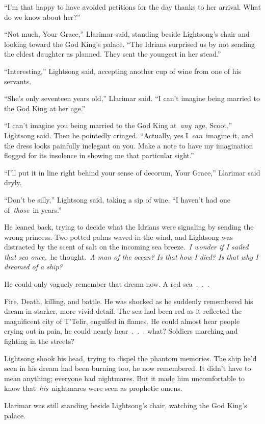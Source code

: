 “I’m that happy to have avoided petitions for the day thanks to her arrival. What do we know about her?”

“Not much, Your Grace,” Llarimar said, standing beside Lightsong’s chair and looking toward the God King’s palace. “The Idrians surprised us by not sending the eldest daughter as planned. They sent the youngest in her stead.”

“Interesting,” Lightsong said, accepting another cup of wine from one of his servants.

“She’s only seventeen years old,” Llarimar said. “I can’t imagine being married to the God King at her age.”

“I can’t imagine you being married to the God King at~\textit{any}~age, Scoot,” Lightsong said. Then he pointedly cringed. “Actually, yes I~\textit{can}~imagine it, and the dress looks painfully inelegant on you. Make a note to have my imagination flogged for its insolence in showing me that particular sight.”

“I’ll put it in line right behind your sense of decorum, Your Grace,” Llarimar said dryly.

“Don’t be silly,” Lightsong said, taking a sip of wine. “I haven’t had one of~\textit{those}~in years.”

He leaned back, trying to decide what the Idrians were signaling by sending the wrong princess. Two potted palms waved in the wind, and Lightsong was distracted by the scent of salt on the incoming sea breeze.~\textit{I wonder if I sailed that sea once,}~he thought.~\textit{A man of the ocean? Is that how I died? Is that why I dreamed of a ship?}

He could only vaguely remember that dream now. A red sea~.~.~.

Fire. Death, killing, and battle. He was shocked as he suddenly remembered his dream in starker, more vivid detail. The sea had been red as it reflected the magnificent city of T’Telir, engulfed in flames. He could almost hear people crying out in pain, he could nearly hear~.~.~. what? Soldiers marching and fighting in the streets?

Lightsong shook his head, trying to dispel the phantom memories. The ship he’d seen in his dream had been burning too, he now remembered. It didn’t have to mean anything; everyone had nightmares. But it made him uncomfortable to know that~\textit{his}~nightmares were seen as prophetic omens.

Llarimar was still standing beside Lightsong’s chair, watching the God King’s palace.

